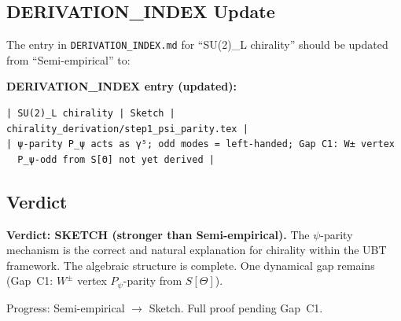 \documentclass[12pt,a4paper]{article}
\theoremstyle{definition}
\theoremstyle{remark}
\begin{document}
\subsection{DERIVATION\_INDEX Update}
\label{subsec:index_update}

The entry in \texttt{DERIVATION\_INDEX.md} for ``SU(2)\_L chirality'' should be
updated from ``Semi-empirical'' to:

\begin{resultbox}
\textbf{DERIVATION\_INDEX entry (updated):}
\begin{verbatim}
| SU(2)_L chirality | Sketch | chirality_derivation/step1_psi_parity.tex |
| ψ-parity P_ψ acts as γ⁵; odd modes = left-handed; Gap C1: W± vertex
  P_ψ-odd from S[Θ] not yet derived |
\end{verbatim}
\end{resultbox}

\subsection{Verdict}
\label{subsec:verdict}

\begin{resultbox}
\textbf{Verdict: SKETCH (stronger than Semi-empirical).}
The $\psi$-parity mechanism is the correct and natural explanation
for chirality within the UBT framework.  The algebraic structure
is complete.  One dynamical gap remains (Gap~C1: $W^\pm$ vertex
$P_\psi$-parity from $S[\Theta]$).

Progress: Semi-empirical $\to$ Sketch.  Full proof pending Gap~C1.
\end{resultbox}

\ifdefined\INCLUDEMODE
\else
  
\end{document}
